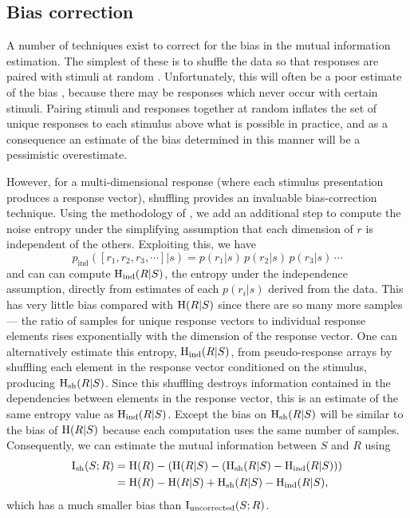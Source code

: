\subsection{Bias correction}
\label{sec:info-bias}

A number of techniques exist to correct for the bias in the mutual information estimation.
The simplest of these is to shuffle the data so that responses are paired with stimuli at random \citep{Optican1991}.
Unfortunately, this will often be a poor estimate of the bias \citep{Panzeri1996}, because there may be responses which never occur with certain stimuli.
Pairing stimuli and responses together at random inflates the set of unique responses to each stimulus above what is possible in practice, and as a consequence an estimate of the bias determined in this manner will be a pessimistic overestimate.

However, for a multi-dimensional response (where each stimulus presentation produces a response vector), shuffling provides an invaluable bias-correction technique.
Using the methodology of \citet{Montemurro2007}, we add an additional step to compute the noise entropy under the simplifying assumption that each dimension of $r$ is independent of the others.
Exploiting this, we have
\begin{equation}
p_\text{ind}([r_1,r_2,r_3,\cdots]|s) = p(r_1|s) \, p(r_2|s) \, p(r_3|s) \, \cdots
\end{equation}
and can can compute $\operatorname{H}_\text{ind}( R | S )$, the entropy under the independence assumption, directly from estimates of each $p(r_i|s)$ derived from the data.
This has very little bias compared with $\operatorname{H}( R | S )$ since there are so many more samples --- the ratio of samples for unique response vectors to individual response elements rises exponentially with the dimension of the response vector.
One can alternatively estimate this entropy, $\operatorname{H}_\text{ind}( R | S )$, from pseudo-response arrays by shuffling each element in the response vector conditioned on the stimulus, producing $\operatorname{H}_\text{sh}( R | S )$.
Since this shuffling destroys information contained in the dependencies between elements in the response vector, this is an estimate of the same entropy value as $\operatorname{H}_\text{ind}( R | S )$.
Except the bias on $\operatorname{H}_\text{sh}( R | S )$ will be similar to the bias of $\operatorname{H}( R | S )$ because each computation uses the same number of samples.
Consequently, we can estimate the mutual information between $S$ and $R$ using
\begin{align}
\operatorname{I}_{\text{sh}}(S;R)
   &= \operatorname{H}( R ) - \left( \operatorname{H}( R | S ) - \left( \operatorname{H}_\text{sh}( R | S ) - \operatorname{H}_\text{ind}( R | S ) \right) \right) \notag
\\ &= \operatorname{H}( R ) - \operatorname{H}( R | S ) + \operatorname{H}_\text{sh}( R | S ) - \operatorname{H}_\text{ind}( R | S )
,\end{align}
which has a much smaller bias than $\operatorname{I}_{\text{uncorrected}}(S;R)$.

